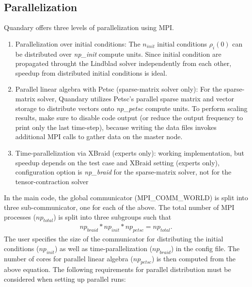 \documentclass[11pt]{article}
\begin{document}
    \subsection{Parallelization}
    Quandary offers three levels of parallelization using MPI. 
    \begin{enumerate}
    \item Parallelization over initial conditions: The $n_{init}$ initial conditions $\rho_i(0)$ can be distributed over \textit{np\_init} compute units. Since initial condition are propagated throught the Lindblad solver independently from each other, speedup from distributed initial conditions is ideal. 
    \item Parallel linear algebra with Petsc (sparse-matrix solver only): For the sparse-matrix solver, Quandary utilizes Petsc's parallel sparse matrix and vector storage to distribute vectors onto \textit{np\_petsc} compute units. To perform scaling results, make sure to disable code output (or reduce the output frequency to print only the last time-step), because writing the data files invokes additional MPI calls to gather data on the master node.
    \item Time-parallelization via XBraid (experts only): working implementation, but
      speedup depends on the test case and XBraid setting (experts only),
      configuration option is \textit{np\_braid}
      for the sparse-matrix solver, not for the tensor-contraction solver
    \end{enumerate}
    In the main code, the global communicator (MPI\_COMM\_WORLD) is split into
    three sub-communicator, one for each of the above. The total number of MPI
    processes ($np_{total}$) is split into three subgroups such that 
    \begin{align*}
      np_{braid} * np_{init} * np_{petsc} = np_{total}.
    \end{align*}
    The user specifies the size of the communicator for distributing the
    initial conditions ($np_{init}$) as well as time-parallelization
    ($np_{braid}$) in the config file. The number of cores for parallel linear
    algebra ($np_{petsc}$) is then computed from the above equation. The
    following requirements for parallel distribution must be considered when
    setting up parallel runs:
\end{document}
